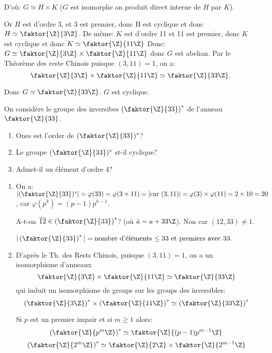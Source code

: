\begin{examplebox}
\begin{enumerate}
		D'où: $G\simeq H\times K$ ($G$ est isomorphe an produit direct interne de $H$ par $K$).
		
		Or $H$ est d'ordre 3, et 3 est premier, donc H est cyclique et donc $H\simeq \faktor{\Z}{3\Z}$.
		De même: $K$ est d'ordre 11 et 11 est premier, donc $K$ est cyclique et donc $K\simeq \faktor{\Z}{11\Z}$
		Donc: $G\simeq \faktor{\Z}{3\Z}\times \faktor{\Z}{11\Z}$ donc $G$ est abelian. 
		Par le Théorème des reste Chinois puisque $(3,11)=1$, on a:
		$$\faktor{\Z}{3\Z}\times\faktor{\Z}{11\Z}\simeq\faktor{\Z}{33\Z}.$$
		
		Donc $G\simeq \faktor{\Z}{33\Z}$. $G$ est cyclique.
	\end{enumerate}
\end{examplebox}

\begin{examplebox}
	On considère le groupe des inversibes $\left(\faktor{\Z}{33}\right)^{\ast}$ de l'anneau $\faktor{\Z}{33}$.
	\begin{enumerate}
		\item Ones est l'order de $(\faktor{\Z}{33})^{\ast}$?
		\item Le groupe $(\faktor{\Z}{33})^{\ast}$ st-il cyclique?
		\item Admet-il un élément d'ordre 4?
	\end{enumerate}
	\begin{enumerate}
		\item On a: $|(\faktor{\Z}{33})^{\ast}|=\varphi(33)=\varphi (3\times 11)=|\text{car $(3,11)$}|=\varphi (3)\times\varphi (11)=2\times 10=20$, car $\varphi(p^k)=(p-1)p^{k-1}$.
		
		
		\begin{remark}
			A-t-on $\overline{12}\in \left(\faktor{\Z}{33}\right)^{\ast}$? (où $\bar{a}=a+33\Z$). Non car $(12, 33)\neq 1$.
			
			$|\left(\faktor{\Z}{33}\right)^{\ast}| = \text{nombre d'éléments $\leq 33$ et premiers avec $33$}$.
		\end{remark}
		
		
		\item D'après le Th. des Rests Chinois, puisque $(3,11)=1$, on a un isomorphisme d'anneaux 
		$$\faktor{\Z}{3\Z}\times\faktor{\Z}{11\Z}\simeq\faktor{\Z}{33\Z}$$
		qui induit un isomorphisme de groups sur les groups des inversibles:
		$$\left(\faktor{\Z}{3\Z}\right)^{\ast}\times\left(\faktor{\Z}{11\Z}\right)^{\ast}\simeq\left(\faktor{\Z}{33\Z}\right)^{\ast}$$
		
		
\begin{rappel}
Si $p$ est un premier impair et si $m\geq 1$ alors: 
$$\left(\faktor{\Z}{p^m\Z}\right)^{\ast}\simeq\faktor{\Z}{(p-1)p^{m-1}\Z}$$
$$\left(\faktor{\Z}{2^m\Z}\right)^{\ast}\simeq \faktor{\Z}{2\Z}\times \faktor{\Z}{2^{m-1}\Z}$$
\end{rappel}


\end{enumerate}
\end{examplebox}
